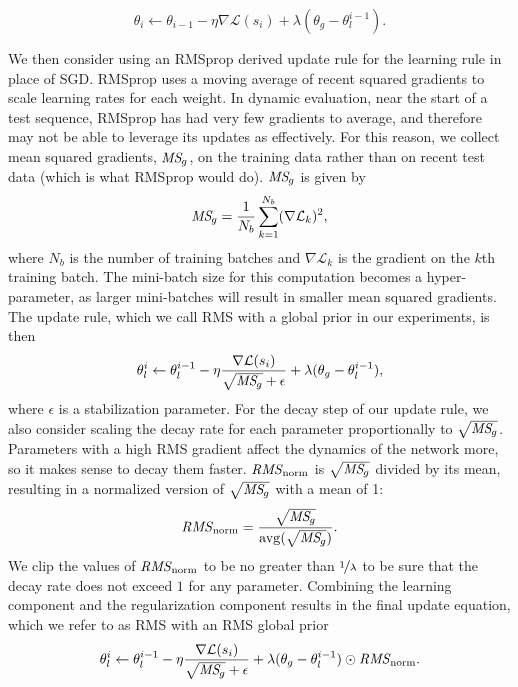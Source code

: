 \documentclass{article} \usepackage{iclr2018_conference,times}
\newcommand{\rmsnorm}{\mathit{RMS}_\mathrm{\kern-0.5pt norm}}
\newcommand{\MSg}{\mathit{MS}_{\kern-1.2pt g}}
\begin{document}
\begin{equation}
\theta_i \leftarrow \theta_{i-1} - \eta \nabla \mathcal{L}(s_i) + \lambda (\theta_g - \theta^{i-1}_l).
\end{equation}



We then consider using an RMSprop \citep{tieleman2012} derived update rule for the learning rule in place of SGD\@. RMSprop uses a moving average of recent squared gradients to scale learning rates for each weight. In dynamic evaluation, near the start of a test sequence, RMSprop has had very few gradients to average, and therefore may not be able to leverage its updates as effectively. For this reason, we collect mean squared gradients, $\MSg$, on the training data rather than on recent test data (which is what RMSprop would do). $\MSg$ is given by
\begin{equation}
\MSg =  \frac{1}{N_b}\sum_{k=1}^{N_b}(\nabla \mathcal{L}_k)^2,
\end{equation}
where $N_b$ is the number of training batches and $\nabla \mathcal{L}_k$ is the gradient on the $k$th training batch. The mini-batch size for this computation becomes a hyper-parameter, as larger mini-batches will result in smaller mean squared gradients. The update rule, which we call RMS with a global prior in our experiments, is then
\begin{equation}
\theta^i_l \leftarrow \theta^{i-1}_l - \eta \frac{\nabla \mathcal{L}(s_i)}{\sqrt{\MSg}+\epsilon} + \lambda (\theta_g - \theta^{i-1}_l) ,
\end{equation}
where $\epsilon$ is a stabilization parameter. For the decay step of our update rule, we also consider scaling the decay rate for each parameter proportionally to $\sqrt{\MSg}$. Parameters with a high RMS gradient affect the dynamics of the network more, so it makes sense to decay them faster. $\rmsnorm$ is $\sqrt{\MSg}$ divided by its mean, resulting in a normalized version of $\sqrt{\MSg}$ with a mean of 1:
\begin{equation}
    \rmsnorm = \frac{\sqrt{\MSg}}{\mathrm{avg}(\sqrt{\MSg})}.
\end{equation}
We clip the values of $\rmsnorm$ to be no greater than $\nicefrac{1}{\lambda}$ to be sure that the decay rate does not exceed $1$ for any parameter. Combining the learning component and the regularization component results in the final update equation, which we refer to as RMS with an RMS global prior
\begin{equation}
\theta^i_l \leftarrow \theta^{i-1}_l - \eta \frac{\nabla \mathcal{L}(s_i)}{\sqrt{\MSg}+\epsilon} + \lambda (\theta_g - \theta^{i-1}_l) \odot \rmsnorm .
\end{equation}
\end{document}
